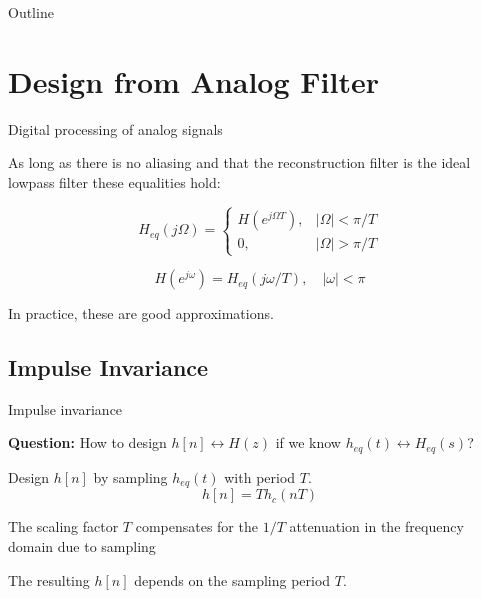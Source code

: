 \documentclass[10pt, aspectratio=169]{beamer}
\begin{document}
%
\begin{frame}{Outline}
	\tableofcontents
\end{frame}

\section{Design from Analog Filter}
\begin{frame}{Digital processing of analog signals}
\begin{center}
	\def\Heff{1}
	\resizebox{0.8\linewidth}{!}{}
\end{center}

As long as there is no aliasing and that the reconstruction filter is the ideal lowpass filter these equalities hold:

\begin{equation}
H_{eq}(j\Omega) = \begin{cases}
H(e^{j\Omega T}), & |\Omega| < \pi/T \\
0, & |\Omega| > \pi/T
\end{cases} \tag{from DSP to analog}
\end{equation}

\begin{equation}
H(e^{j\omega}) = H_{eq}(j\omega/T), \quad|\omega| < \pi  \tag{from analog to DSP}
\end{equation}

In practice, these are good approximations.
\end{frame}

\subsection{Impulse Invariance}
\begin{frame}{Impulse invariance}

\textbf{Question:} How to design $h[n] \longleftrightarrow H(z)$ if we know $h_{eq}(t) \longleftrightarrow H_{eq}(s)$?

\begin{center}
	\def\Heff{1}
	\resizebox{0.8\linewidth}{!}{}
\end{center}

Design $h[n]$ by sampling $h_{eq}(t)$ with period $T$.
\begin{equation}
	h[n] = Th_c(nT) \tag{impulse invariance}
\end{equation}

The scaling factor $T$ compensates for the $1/T$ attenuation in the frequency domain due to sampling

The resulting $h[n]$ depends on the sampling period $T$.

\end{frame}
\end{document}
